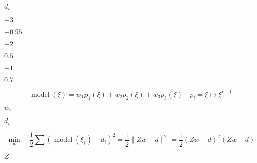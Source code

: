 \documentclass[10pt]{book}
\begin{document}
\begin{mdSnippets}
\begin{mdInlineSnippet}[d247f594c78d0d2be10fc6d82512cc4e]
$d_i$\end{mdInlineSnippet}%
\begin{mdInlineSnippet}%
$-3$\end{mdInlineSnippet}%
\begin{mdInlineSnippet}[98e74e9689db01915cc605dd3608bf83]%
$-0.95$\end{mdInlineSnippet}%
\begin{mdInlineSnippet}[5d7b9adcbe1c629ec722529dd12e5129]%
$-2$\end{mdInlineSnippet}%
\begin{mdInlineSnippet}[d310cb367d993fb6fb584b198a2fd72c]%
$0.5$\end{mdInlineSnippet}%
\begin{mdInlineSnippet}[6bb61e3b7bce0931da574d19d1d82c88]%
$-1$\end{mdInlineSnippet}%
\begin{mdInlineSnippet}[91c85f899e56014969935fefd68830b9]%
$0.7$\end{mdInlineSnippet}%
\begin{mdDisplaySnippet}[5ef057d138f01992c0548d4f3a5a289d]%
\[%
 \operatorname{model}(\xi)=w_{1} p_{1}(\xi)+w_{2} p_{2}(\xi)+w_{3} p_{3}(\xi) \quad p_{i}=\xi \mapsto \xi^{i-1}
\]%
\end{mdDisplaySnippet}%
\begin{mdInlineSnippet}[aa38f107289d4d73d516190581397349]%
$w_i$\end{mdInlineSnippet}%
\begin{mdInlineSnippet}[d247f594c78d0d2be10fc6d82512cc4e]%
$d_i$\end{mdInlineSnippet}%
\begin{mdDisplaySnippet}%
\[%
 \min_{w} \quad \frac{1}{2} \sum\left(\operatorname{model}\left(\xi_{i}\right)-d_{i}\right)^{2}=\frac{1}{2}\|Z w-d\|^{2}=\frac{1}{2}(Z w-d)^T(Z w-d)
\]%
\end{mdDisplaySnippet}%
\begin{mdInlineSnippet}[21c2e59531c8710156d34a3c30ac81d5]%
$Z$\end{mdInlineSnippet}%
\begin{mdInlineSnippet}[f1290186a5d0b1ceab27f4e77c0c5d68]%

\end{mdInlineSnippet}
\end{mdSnippets}
\end{document}

